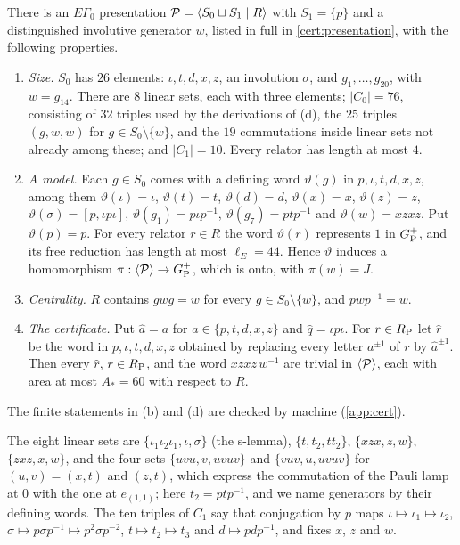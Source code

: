 \begin{proposition}\label{prop:presentation}
There is an $E\Gamma_0$ presentation $\mathcal P=\langle S_0\sqcup S_1\mid R\rangle$ with $S_1=\{p\}$ and a distinguished involutive generator
$w$, listed in full in \cref{cert:presentation}, with the following properties.
\begin{enumerate}[label=(\alph*),itemsep=1pt]
\item \emph{Size.} $S_0$ has $26$ elements: $\iota,t,d,x,z$, an involution $\sigma$, and $g_1,\dots,g_{20}$, with $w=g_{14}$. There are $8$
linear sets, each with three elements; $|C_0|=76$, consisting of $32$ triples used by the derivations of (d), the $25$ triples $(g,w,w)$
for $g\in S_0\setminus\{w\}$, and the $19$ commutations inside linear sets not already among these; and $|C_1|=10$. Every relator has
length at most $4$.
\item \emph{A model.} Each $g\in S_0$ comes with a defining word $\vartheta(g)$ in $p,\iota,t,d,x,z$, among them $\vartheta(\iota)=\iota$,
$\vartheta(t)=t$, $\vartheta(d)=d$, $\vartheta(x)=x$, $\vartheta(z)=z$, $\vartheta(\sigma)=[p,\iota p\iota]$, $\vartheta(g_1)=p\iota p^{-1}$,
$\vartheta(g_7)=ptp^{-1}$ and $\vartheta(w)=xzxz$. Put $\vartheta(p)=p$. For every relator $r\in R$ the word $\vartheta(r)$ represents
$1$ in $G_{\mathrm P}^{+}$, and its free reduction has length at most $\ell_E=44$. Hence $\vartheta$ induces a homomorphism
$\pi:\langle\mathcal P\rangle\to G_{\mathrm P}^{+}$, which is onto, with $\pi(w)=J$.
\item \emph{Centrality.} $R$ contains $gwg=w$ for every $g\in S_0\setminus\{w\}$, and $pwp^{-1}=w$.
\item \emph{The certificate.} Put $\hat a=a$ for $a\in\{p,t,d,x,z\}$ and $\hat q=\iota p\iota$. For $r\in R_{\mathrm P}$ let $\hat r$ be the word in
$p,\iota,t,d,x,z$ obtained by replacing every letter $a^{\pm1}$ of $r$ by $\hat a^{\pm1}$. Then every $\hat r$, $r\in R_{\mathrm P}$, and the word
$xzxz\,w^{-1}$ are trivial in $\langle\mathcal P\rangle$, each with area at most $A_*=60$ with respect to $R$.
\end{enumerate}
The finite statements in (b) and (d) are checked by machine (\cref{app:cert}).
\end{proposition}

The eight linear sets are $\{\iota_1\iota_2\iota_1,\iota,\sigma\}$ (the s-lemma), $\{t,t_2,tt_2\}$, $\{xzx,z,w\}$, $\{zxz,x,w\}$, and the
four sets $\{uvu,v,uvuv\}$ and $\{vuv,u,uvuv\}$ for $(u,v)=(x,t)$ and $(z,t)$, which express the commutation of the Pauli lamp at $0$ with
the one at $e_{(1,1)}$; here $t_2=ptp^{-1}$, and we name generators by their defining words. The ten triples of $C_1$ say that conjugation by
$p$ maps $\iota\mapsto\iota_1\mapsto\iota_2$, $\sigma\mapsto p\sigma p^{-1}\mapsto p^2\sigma p^{-2}$, $t\mapsto t_2\mapsto t_3$ and
$d\mapsto pdp^{-1}$, and fixes $x$, $z$ and $w$.

